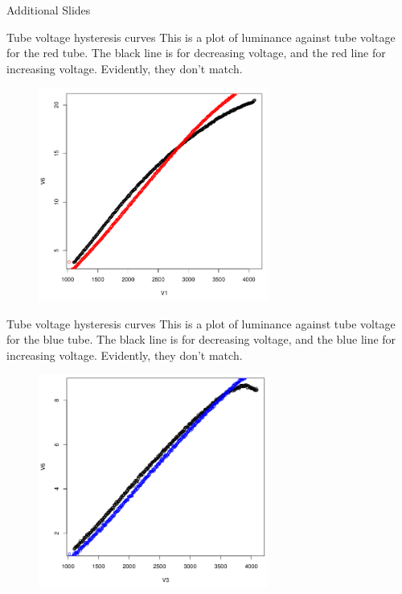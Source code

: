 \documentclass{beamer}
\begin{document}


\begin{frame}[t]{Additional Slides}
\end{frame}


\begin{frame}[t]{Tube voltage hysteresis curves}
This is a plot of luminance against tube voltage for the red tube. The black line is for decreasing voltage, and the red line for increasing voltage. Evidently, they don't match.
\begin{figure}[c]
\includegraphics[height=7cm]{redhysteresis.png}
\end{figure}
\end{frame}

\begin{frame}[t]{Tube voltage hysteresis curves}
This is a plot of luminance against tube voltage for the blue tube. The black line is for decreasing voltage, and the blue line for increasing voltage. Evidently, they don't match.
\begin{figure}[c]
\includegraphics[height=7cm]{bluehysteresis.png}
\end{figure}
\end{frame}
\end{document}
